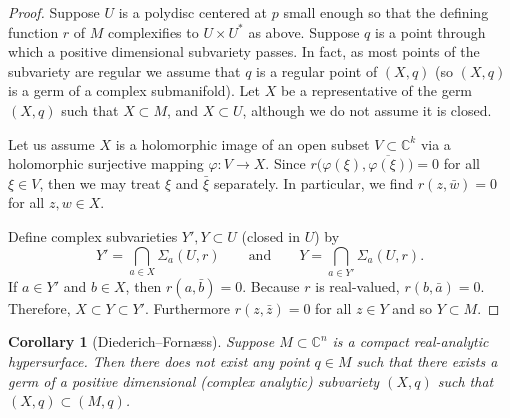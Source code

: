 \documentclass[12pt,openany]{book}
\newcommand{\C}{{\mathbb{C}}}
\theoremstyle{plain}
\newtheorem{cor}[thm]{Corollary}
\theoremstyle{remark}
\theoremstyle{definition}
\theoremstyle{exercise}
\theoremstyle{example}
\begin{document}
\begin{proof}
Suppose $U$ is a polydisc centered at $p$
small enough so that the defining function
$r$ of $M$ complexifies to $U \times U^*$ as above.
Suppose $q$ is a point through which a positive dimensional subvariety
passes.
In fact, as most points of the subvariety are regular we 
assume that $q$ is a regular point of $(X,q)$ (so $(X,q)$ is a germ of a
complex submanifold).
Let $X$ be a representative of the germ $(X,q)$ such that $X \subset M$,
and $X \subset U$, although we do not assume it is closed.


Let us assume $X$ is a holomorphic
image of an open subset $V \subset \C^k$ via a holomorphic surjective mapping $\varphi \colon V \to
X$.  Since $r\bigl(\varphi(\xi),\overline{\varphi(\xi)}\bigr) = 0$
for all $\xi \in V$, then we may treat $\xi$ and $\bar{\xi}$ separately.
In particular, we find 
$r(z,\bar{w}) = 0$ for all $z,w \in X$.

Define complex subvarieties $Y', Y \subset U$ (closed in $U$) by
\begin{equation*}
Y' = \bigcap_{a \in X} \Sigma_a(U,r) 
\qquad \text{and} \qquad
Y = \bigcap_{a \in Y'} \Sigma_a(U,r) .
\end{equation*}
If $a \in Y'$ and $b \in X$, then $r(a,\bar{b}) = 0$.
Because $r$ is real-valued,
$r(b,\bar{a}) = 0$.  Therefore,
$X \subset Y \subset Y'$.  Furthermore $r(z,\bar{z}) = 0$
for all $z \in Y$ and so $Y \subset M$.
\end{proof}

\begin{cor}[Diederich--Forn\ae ss]
Suppose $M \subset \C^n$ is a compact real-analytic hypersurface.
Then there does not exist any point $q \in M$ such that
there exists a germ of a positive dimensional (complex analytic) subvariety
$(X,q)$ such that $(X,q) \subset (M,q)$.
\end{cor}
\end{document}
